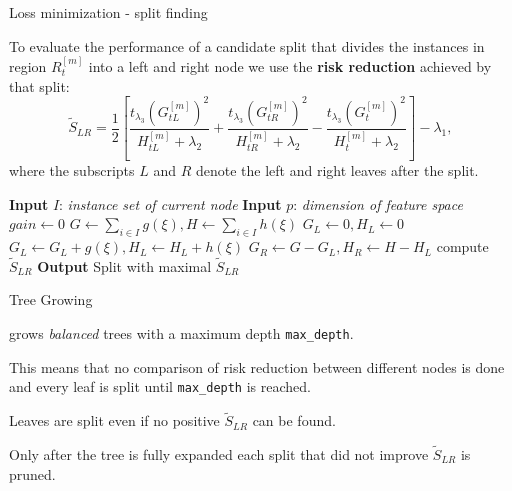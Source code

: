 \begin{vbframe}{Loss minimization - split finding}

To evaluate the performance of a candidate split that divides the instances in region $R_t^{[m]}$ into a left and right node we use the \textbf{risk reduction} achieved by that split:
$$
\tilde S_{LR} =
 \frac12 \left[
 \frac{t_{\lambda_3} \left( G^{[m]}_{tL} \right)^2}{H^{[m]}_{tL} + \lambda_2} + \frac{t_{\lambda_3}\left(G^{[m]}_{tR}\right)^2}{H^{[m]}_{tR} + \lambda_2} - \frac{t_{\lambda_3}\left(G^{[m]}_{t}\right)^2}{H^{[m]}_{t} + \lambda_2}
 \right] - \lambda_1,
$$
where the subscripts $L$ and $R$ denote the left and right leaves after the split.


\lz

\framebreak

\begin{algorithm}[H]

\begin{footnotesize}
\begin{center}

  \begin{algorithmic}[1]
    \State \textbf{Input} $I$: \emph{instance set of current node}
    \State \textbf{Input} $p$: \emph{dimension of feature space}
    \State $gain \gets 0$
    \State $G \gets \sum_{i \in I} g(\xi), {H} \gets \sum_{i \in I} h(\xi)$
      \State $G_L \gets 0, {H}_L \gets 0$
        \State ${G}_L \gets {G}_L + g(\xi), {H}_L \gets {H}_L + h(\xi)$
        \State ${G}_R \gets G - {G}_L, {H}_R \gets {H} - {H}_L$
        \State compute $\tilde S_{LR}$
      \EndFor
    \EndFor
    \State \textbf{Output} Split with maximal $\tilde S_{LR}$
  \end{algorithmic}
\end{center}
\end{footnotesize}
\caption{(Exact) Algorithm for split finding}
\end{algorithm}

\end{vbframe}

\begin{vbframe}{Tree Growing}

   grows \emph{balanced} trees with a maximum depth \texttt{max\_depth}.

  \lz

  This means that no comparison of risk reduction between different nodes is done and every leaf is split until \texttt{max\_depth} is reached.

  \lz

  Leaves are split even if no positive $\tilde S_{LR}$ can be found.

  \lz

  Only after the tree is fully expanded each split that did not improve $\tilde S_{LR}$ is pruned.

\end{vbframe}


